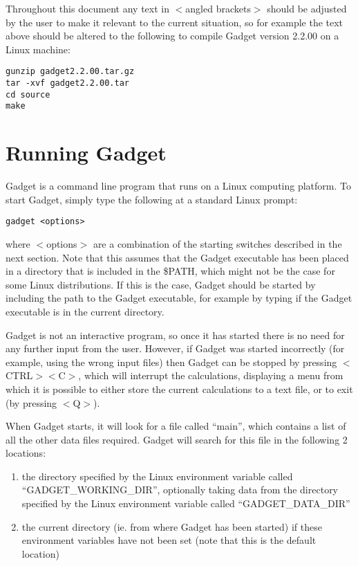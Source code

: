 \documentclass[]{book}
\begin{document}
Throughout this document any text in \(<\)angled brackets\(>\) should be
adjusted by the user to make it relevant to the current situation, so
for example the text above should be altered to the following to compile
Gadget version 2.2.00 on a Linux machine:

\begin{verbatim}
gunzip gadget2.2.00.tar.gz
tar -xvf gadget2.2.00.tar
cd source
make
\end{verbatim}

\hypertarget{sec:runninggadget}{%
\section{Running Gadget}\label{sec:runninggadget}}

Gadget is a command line program that runs on a Linux computing
platform. To start Gadget, simply type the following at a standard Linux
prompt:

\begin{verbatim}
gadget <options>
\end{verbatim}

where \(<\)options\(>\) are a combination of the starting switches described
in the next section. Note that this assumes that the Gadget executable
has been placed in a directory that is included in the \$PATH, which
might not be the case for some Linux distributions. If this is the case,
Gadget should be started by including the path to the Gadget executable,
for example by typing if the Gadget executable is in the current
directory.

Gadget is not an interactive program, so once it has started there is no
need for any further input from the user. However, if Gadget was started
incorrectly (for example, using the wrong input files) then Gadget can
be stopped by pressing \(<\)CTRL\(><\)C\(>\), which will interrupt the
calculations, displaying a menu from which it is possible to either
store the current calculations to a text file, or to exit (by pressing
\(<\)Q\(>\)).

When Gadget starts, it will look for a file called ``main'', which
contains a list of all the other data files required. Gadget will search
for this file in the following 2 locations:

\begin{enumerate}
\def\labelenumi{\arabic{enumi}.}
\item
  the directory specified by the Linux environment variable called
  ``GADGET\_WORKING\_DIR'', optionally taking data from the directory
  specified by the Linux environment variable called
  ``GADGET\_DATA\_DIR''
\item
  the current directory (ie. from where Gadget has been started) if
  these environment variables have not been set (note that this is the
  default location)
\end{enumerate}
\end{document}
